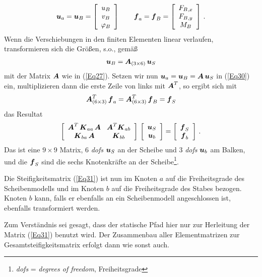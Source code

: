 \begin{align}
\vek u_a = \vek u_B =\left[\barr{c} u_B \\ v_B \\ \Np_B\earr \right] \qquad \vek f_a = \vek f_B = \left[\barr{c}  F_{B,x} \\  F_{B,y} \\ M_B\earr \right]\,.
\end{align}
Wenn die Verschiebungen in den finiten Elementen linear verlaufen, transformieren sich die Gr\"{o}{\ss}en, s.o., gem\"{a}{\ss}
\begin{align}
\vek u_B = \vek A_{(3 \times 6)}\,\vek u_S
\end{align}
mit der Matrix $\vek A$ wie in (\ref{Eq27}). Setzen wir nun $\vek u_a = \vek u_B = \vek A\,\vek u_S$ in (\ref{Eq30}) ein, multiplizieren dann die erste Zeile von links mit $\vek A^T$, so ergibt sich mit
\begin{align}
\vek A^T_{(6 \times 3)}\,\vek f_a = \vek A^T_{(6 \times 3)}\,\vek f_B = \vek f_S
\end{align}
das Resultat
\begin{align}\label{Eq31}
\left[\barr{c @{\hspace{3mm}} c } \vek A^T\,\vek K_{aa}\,\vek A & \vek A^T\vek K_{ab} \\
\vek K_{ba}\,\vek A &\vek K_{bb}\earr \right]\,\left[\barr{c} \vek u_S \\ \vek u_b\earr \right] = \left[\barr{c} \vek f_S \\ \vek f_b\earr \right]\,.
\end{align}
Das ist eine $9 \times 9 $ Matrix, 6 {\em dofs\/} $\vek u_S$ an der Scheibe und 3 {\em dofs\/} $\vek u_b$ am Balken, und die $\vek f_S$ sind die sechs Knotenkr\"{a}fte an der Scheibe\footnote{{\em dofs\/} = {\em degrees of freedom\/}, Freiheitsgrade}.

Die Steifigkeitsmatrix (\ref{Eq31}) ist nun im Knoten $a $ auf die Freiheitsgrade des Scheibenmodells und im Knoten $b$ auf die Freiheitsgrade des Stabes bezogen. Knoten $b$ kann, falls er ebenfalls an ein Scheibenmodell angeschlossen ist, ebenfalls transformiert werden.

Zum Verst\"{a}ndnis sei gesagt, dass der statische Pfad hier nur zur Herleitung der Matrix (\ref{Eq31}) benutzt wird. Der  Zusammenbau aller Elementmatrizen zur Gesamtsteifigkeitsmatrix erfolgt dann wie sonst auch.\\

